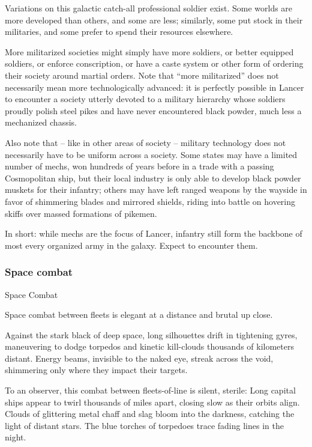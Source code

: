 Variations on this galactic catch-all professional soldier exist. Some worlds are more developed  
than others, and some are less; similarly, some put stock in their militaries, and some prefer to  
spend their resources elsewhere. 
 

More militarized societies might simply have more soldiers, or better equipped soldiers, or  
enforce conscription, or have a caste system or other form of ordering their society around  
martial orders. Note that “more militarized” does not necessarily mean more technologically  
advanced: it is perfectly possible in Lancer to encounter a society utterly devoted to a military  
hierarchy whose soldiers proudly polish steel pikes and have never encountered black powder,  
much less a mechanized chassis. 
 

Also note that -- like in other areas of society -- military technology does not necessarily have to  
be uniform across a society. Some states may have a limited number of mechs, won hundreds of  
years before in a trade with a passing Cosmopolitan ship, but their local industry is only able to  
develop black powder muskets for their infantry; others may have left ranged weapons by the  
wayside in favor of shimmering blades and mirrored shields, riding into battle on hovering skiffs  
over massed formations of pikemen.
 

In short: while mechs are the focus of Lancer, infantry still form the backbone of most every  
organized army in the galaxy. Expect to encounter them.   
 
\subsubsection{Space combat}
Space Combat  

Space combat between fleets is elegant at a distance and brutal up close.
 

Against the stark black of deep space, long silhouettes drift in tightening gyres, maneuvering to  
dodge torpedos and kinetic kill-clouds thousands of kilometers distant. Energy beams, invisible  
to the naked eye, streak across the void, shimmering only where they impact their targets. 
 

To an observer, this combat between fleets-of-line is silent, sterile: Long capital ships appear to  
twirl thousands of miles apart, closing slow as their orbits align. Clouds of glittering metal chaff  
and slag bloom into the darkness, catching the light of distant stars. The blue torches of  
torpedoes trace fading lines in the night. 
 


